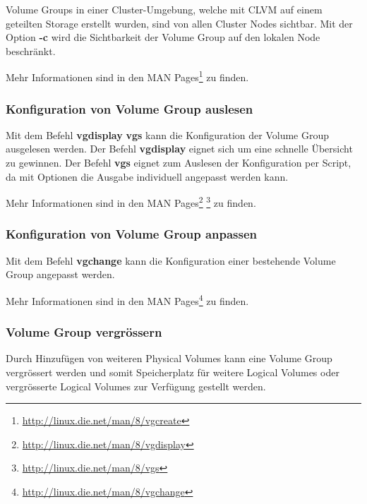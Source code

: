 Volume Groups in einer Cluster-Umgebung, welche mit CLVM auf einem geteilten Storage erstellt wurden, sind von allen Cluster Nodes sichtbar. Mit der Option \textbf{-c} wird die Sichtbarkeit der Volume Group auf den lokalen Node beschränkt.



Mehr Informationen sind in den MAN Pages\footnote{\href{http://linux.die.net/man/8/vgcreate}{http://linux.die.net/man/8/vgcreate}} zu finden.

\subsubsection{Konfiguration von Volume Group auslesen}

Mit dem Befehl \textbf{vgdisplay} \textbf{vgs} kann die Konfiguration der Volume Group ausgelesen werden.
Der Befehl \textbf{vgdisplay} eignet sich um eine schnelle Übersicht zu gewinnen. Der Befehl \textbf{vgs} eignet zum Auslesen der Konfiguration per Script, da mit Optionen die Ausgabe individuell angepasst werden kann.




Mehr Informationen sind in den MAN Pages\footnote{\href{http://linux.die.net/man/8/vgdisplay}{http://linux.die.net/man/8/vgdisplay}} \footnote{\href{http://linux.die.net/man/8/vgs}{http://linux.die.net/man/8/vgs}} zu finden.

\subsubsection{Konfiguration von Volume Group anpassen}

Mit dem Befehl \textbf{vgchange} kann die Konfiguration einer bestehende Volume Group angepasst werden.


Mehr Informationen sind in den MAN Pages\footnote{\href{http://linux.die.net/man/8/vgchange}{http://linux.die.net/man/8/vgchange}} zu finden.

\subsubsection{Volume Group vergrössern}

Durch Hinzufügen von weiteren Physical Volumes kann eine Volume Group vergrössert werden und somit Speicherplatz für weitere Logical Volumes oder vergrösserte Logical Volumes zur Verfügung gestellt werden.

